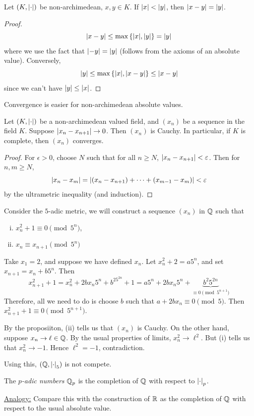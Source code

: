 \documentclass{article}
\begin{document}
\begin{lemma}
    Let \((K, \abs{\cdot})\) be non-archimedean, \(x, y \in K\). If \(\abs{x} < \abs{y}\), then \(\abs{x-y} = \abs{y}\).
\end{lemma}

\begin{proof}
    \[\abs{x - y} \le \max\left\{\abs{x}, \abs{y}\right\} = \abs{y}\]
    where we use the fact that \(\abs{-y} = \abs{y}\) (follows from the axioms of an absolute value). Conversely,
    \[\abs{y} \le \max\left\{\abs{x}, \abs{x - y}\right\} \le \abs{x - y}\]
    since we can't have \(\abs{y} \le \abs{x}\).
\end{proof}

Convergence is easier for non-archimedean absolute values.

\begin{proposition}
    Let \((K, \abs{\cdot})\) be a non-archimedean valued field, and \((x_n)\) be a sequence in the field \(K\). Suppose \(\abs{x_n - x_{n+1}} \to 0\). Then \((x_n)\) is Cauchy. In particular, if \(K\) is complete, then \((x_n)\) converges.
\end{proposition}

\begin{proof}
    For \(\epsilon > 0\), choose \(N\) such that for all \(n \ge N\), \(\abs{x_n - x_{n+1}} < \varepsilon\). Then for \(n, m \ge N\), 
    \[\abs{x_n - x_m} = \abs{(x_n - x_{n+1}) + \cdots + (x_{m-1} - x_m)} < \varepsilon\]
    by the ultrametric inequality (and induction).
\end{proof}

\begin{example}
    Consider the \(5\)-adic metric, we will construct a sequence \((x_n)\) in \(\mathbb{Q}\) such that
    \begin{enumerate}[(i)]
        \item \(x_n^2 + 1 \equiv 0 \pmod{5^n}\),
        \item \(x_n \equiv x_{n+1} \pmod{5^n}\)
    \end{enumerate}
    
    Take \(x_1 = 2\), and suppose we have defined \(x_n\). Let \(x_n^2 + 2 = a 5^n\), and set \(x_{n+1} = x_n + b5^n\). Then
    \[x_{n+1}^2 + 1 = x_n^2 + 2b x_n5^n + b^25^{2n} + 1 = a5^n + 2b x_n 5^n + \underbrace{b^2 5^{2n}}_{\equiv 0 \pmod{5^{n+1}}}\]
    Therefore, all we need to do is choose \(b\) such that \(a + 2bx_n \equiv 0 \pmod 5\). Then \(x_{n+1}^2 + 1 \equiv 0 \pmod{5^{n+1}}\).

    By the proposiiton, (ii) tells us that \((x_n)\) is Cauchy. On the other hand, suppose \(x_n \to \ell \in \mathbb{Q}\). By the usual properties of limits, \(x_n^2 \to \ell^2\). But (i) tells us that \(x_n^2 \to -1\). Hence \(\ell^2 = -1\), contradiction.

    Using this, \((\mathbb{Q}, \abs{\cdot}_5)\) is not compete.
\end{example}

\begin{definition}
     The \emph{\(p\)-adic numbers} \(\mathbb{Q}_p\) is the completion of \(\mathbb{Q}\) with respect to \(\abs{\cdot}_p\).
\end{definition}

\underline{Analogy:} Compare this with the construction of \(\mathbb{R}\) as the completion of \(\mathbb{Q}\) with respect to the usual absolute value.
\end{document}
